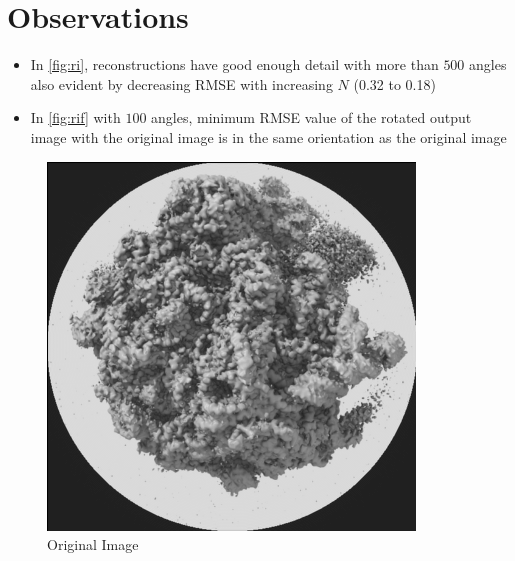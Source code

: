 \documentclass[a4paper, landscape]{article}
\begin{document}
\section{Observations}
\begin{itemize}
	\item In \ref{fig:ri}, reconstructions have good enough detail with more than $500$ angles also evident by decreasing RMSE with increasing $N$ (0.32 to 0.18)
	\item In \ref{fig:rif} with $100$ angles, minimum RMSE value of the rotated output image with the original image is in the same orientation as the original image
\end{itemize}
\begin{figure}[H]
	\centering
	\includegraphics[width=0.2\linewidth]{results/cryoem.png}
	\caption{Original Image}
	\label{fig:oi}
\end{figure}
\end{document}
